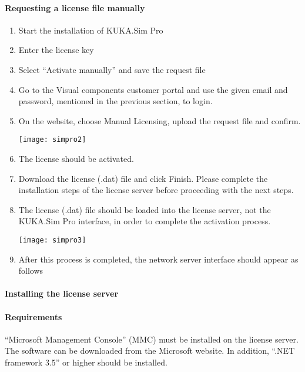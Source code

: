  				\paragraph{Requesting a license file manually}
 					\begin{enumerate}
 						\item Start the installation of KUKA.Sim Pro 
 						\item Enter the license key
 						\item Select “Activate manually” and save the request file
 						\item Go to the Visual components customer portal and use the given email and password, mentioned in the previous section, to login.
 						\item On the website, choose Manual Licensing, upload the request file and confirm.
 						
 						\begin{center}
						\texttt{[image: simpro2]}
 						\end{center}
 					
 					
 						
 						\item The license should be activated.
 						\item Download the license (.dat) file and click Finish. Please complete the installation steps of the license server before proceeding with the next steps.
 						\item The license (.dat) file should be loaded into the license server, not the KUKA.Sim Pro interface, in order to complete the activation process. 
 						
						\texttt{[image: simpro3]}
						 						
 						\item After this process is completed, the network server interface should appear as follows
 					\end{enumerate}
 				
 				\paragraph{Installing the license server}
 				\paragraph{Requirements}
 				“Microsoft Management Console” (MMC) must be installed on the license server. The software can be downloaded from the Microsoft website. In addition, “.NET framework 3.5” or higher should be installed. 
 				
